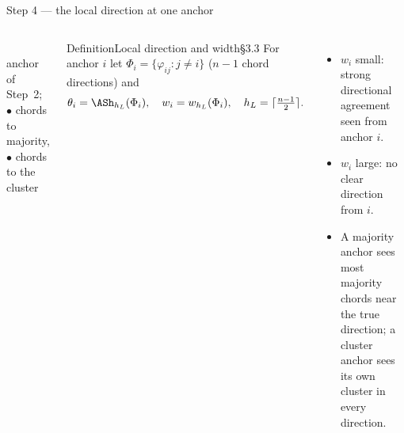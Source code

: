 \documentclass[aspectratio=169,9pt]{beamer}
\newcommand{\cR}{2.0}
\newcommand{\projcircle}[1][30]{%
  \draw[mute,line width=0.9pt] (0,0) circle (\cR);
  \foreach \a in {0,#1,...,150}{%
    \draw[mute] ({(\cR-0.05)*cos(2*\a)},{(\cR-0.05)*sin(2*\a)}) -- ({(\cR+0.05)*cos(2*\a)},{(\cR+0.05)*sin(2*\a)});
    \node[font=\sffamily\tiny,mute] at ({(\cR+0.3)*cos(2*\a)},{(\cR+0.3)*sin(2*\a)}) {$\a^\circ$};}}
\newcommand{\arcdeg}[4]{%
  \draw[#3,line width=2.4pt,line cap=round] plot[domain=2*#1:2*#2,samples=40] ({(\cR+#4)*cos(\x)},{(\cR+#4)*sin(\x)});}
\begin{document}
\begin{frame}{Step 4 --- the local direction at one anchor}
\begin{columns}[T]
\centering
{}\\[-2pt]
{\sffamily\scriptsize\color{mute}anchor of Step~2; \textcolor{cmaj}{$\bullet$} chords to majority, \textcolor{cbad}{$\bullet$} chords to the cluster}
\begin{rdef}{Definition}{Local direction and width}{\S3.3}
For anchor $i$ let $\Phi_i=\{\varphi_{ij}:j\ne i\}$ ($n-1$ chord directions) and
\[\theta_i=\ASh_{h_L}(\Phi_i),\quad w_i=w_{h_L}(\Phi_i),\quad h_L=\lceil\tfrac{n-1}{2}\rceil.\]
\end{rdef}
\begin{itemize}\setlength\itemsep{3pt}\small
\item $w_i$ small: strong directional agreement seen from anchor $i$.
\item $w_i$ large: no clear direction from $i$.
\item A \textcolor{cmaj}{majority} anchor sees most majority chords near the true direction; a \textcolor{cbad}{cluster} anchor sees its own cluster in every direction.
\end{itemize}
\end{columns}
\end{frame}
\end{document}
